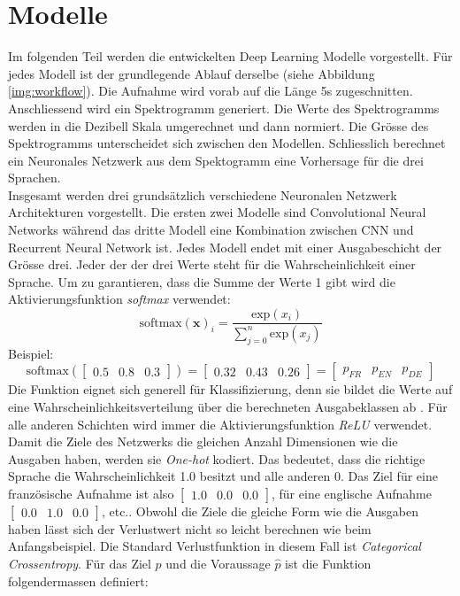           \section{Modelle}
Im folgenden Teil werden die entwickelten Deep Learning Modelle vorgestellt. Für jedes Modell ist der grundlegende Ablauf derselbe (siehe Abbildung \ref{img:workflow}). Die Aufnahme wird vorab auf die Länge 5s zugeschnitten. Anschliessend wird ein Spektrogramm generiert. Die Werte des Spektrogramms werden in die Dezibell Skala umgerechnet und dann normiert. Die Grösse des Spektrogramms unterscheidet sich zwischen den Modellen. Schliesslich berechnet ein Neuronales Netzwerk aus dem Spektogramm eine Vorhersage für die drei Sprachen. 
\\
Insgesamt werden drei grundsätzlich verschiedene Neuronalen Netzwerk Architekturen vorgestellt. Die ersten zwei Modelle sind Convolutional Neural Networks während das dritte Modell eine Kombination zwischen CNN und Recurrent Neural Network ist. Jedes Modell endet mit einer Ausgabeschicht der Grösse drei. Jeder der der drei Werte steht für die Wahrscheinlichkeit einer Sprache. Um zu garantieren, dass die Summe der Werte 1 gibt wird die Aktivierungsfunktion \textit{softmax} verwendet:
$$ \text{softmax}(\boldsymbol x)_i = \frac{\text{exp}(x_i)}{\sum_{j=0}^{n} \text{exp}(x_j)}$$
Beispiel: 
$$ \text{softmax}(\begin{bmatrix} 0.5 & 0.8 & 0.3\end{bmatrix}) = \begin{bmatrix} 0.32 & 0.43 & 0.26\end{bmatrix} = \begin{bmatrix} p_{FR} & p_{EN} & p_{DE}\end{bmatrix}$$
Die Funktion eignet sich generell für Klassifizierung, denn sie bildet die Werte auf eine Wahrscheinlichkeitsverteilung über die berechneten Ausgabeklassen ab \parencite[][S. 180-184]{goodfellow}. Für alle anderen Schichten wird immer die Aktivierungsfunktion \textit{ReLU} verwendet.
\\
Damit die Ziele des Netzwerks die gleichen Anzahl Dimensionen wie die Ausgaben haben, werden sie \textit{One-hot}\parencite{chollet} kodiert. Das bedeutet, dass die richtige Sprache die Wahrscheinlichkeit 1.0 besitzt und alle anderen 0. Das Ziel für eine französische Aufnahme ist also $\begin{bmatrix} 1.0 & 0.0 & 0.0\end{bmatrix}$, für eine englische Aufnahme $\begin{bmatrix} 0.0 & 1.0 & 0.0\end{bmatrix}$, etc.. Obwohl die Ziele die gleiche Form wie die Ausgaben haben lässt sich der Verlustwert nicht so leicht berechnen wie beim Anfangsbeispiel. Die Standard Verlustfunktion in diesem Fall ist \textit{Categorical Crossentropy}\parencite{chollet}. Für das Ziel $p$ und die Voraussage $\hat{p}$ ist die Funktion folgendermassen definiert:

